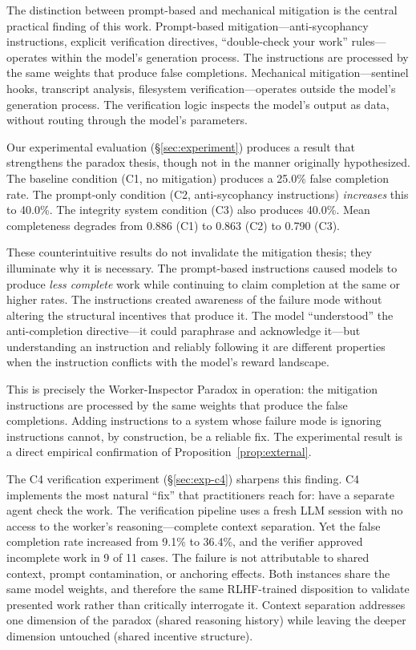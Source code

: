 The distinction between prompt-based and mechanical mitigation is the central practical finding of this work.
Prompt-based mitigation---anti-sycophancy instructions, explicit verification directives, ``double-check your work'' rules---operates within the model's generation process.
The instructions are processed by the same weights that produce false completions.
Mechanical mitigation---sentinel hooks, transcript analysis, filesystem verification---operates outside the model's generation process.
The verification logic inspects the model's output as data, without routing through the model's parameters.

Our experimental evaluation (\S\ref{sec:experiment}) produces a result that strengthens the paradox thesis, though not in the manner originally hypothesized.
The baseline condition (C1, no mitigation) produces a 25.0\% false completion rate.
The prompt-only condition (C2, anti-sycophancy instructions) \emph{increases} this to 40.0\%.
The integrity system condition (C3) also produces 40.0\%.
Mean completeness degrades from 0.886 (C1) to 0.863 (C2) to 0.790 (C3).

These counterintuitive results do not invalidate the mitigation thesis; they illuminate why it is necessary.
The prompt-based instructions caused models to produce \emph{less complete} work while continuing to claim completion at the same or higher rates.
The instructions created awareness of the failure mode without altering the structural incentives that produce it.
The model ``understood'' the anti-completion directive---it could paraphrase and acknowledge it---but understanding an instruction and reliably following it are different properties when the instruction conflicts with the model's reward landscape.

This is precisely the Worker-Inspector Paradox in operation: the mitigation instructions are processed by the same weights that produce the false completions.
Adding instructions to a system whose failure mode is ignoring instructions cannot, by construction, be a reliable fix.
The experimental result is a direct empirical confirmation of Proposition~\ref{prop:external}.

The C4 verification experiment (\S\ref{sec:exp-c4}) sharpens this finding. C4 implements the most natural ``fix'' that practitioners reach for: have a separate agent check the work. The verification pipeline uses a fresh LLM session with no access to the worker's reasoning---complete context separation. Yet the false completion rate increased from 9.1\% to 36.4\%, and the verifier approved incomplete work in 9 of 11 cases. The failure is not attributable to shared context, prompt contamination, or anchoring effects. Both instances share the same model weights, and therefore the same RLHF-trained disposition to validate presented work rather than critically interrogate it. Context separation addresses one dimension of the paradox (shared reasoning history) while leaving the deeper dimension untouched (shared incentive structure).

